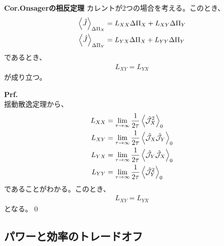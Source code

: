 \documentclass[a4paper,11pt]{jsarticle}
\numberwithin{equation}{section}
\begin{document}
\begin{itembox}[l]{\textbf{Cor.Onsagerの相反定理}}
  カレントが2つの場合を考える。このとき、
  \begin{align}
    \ev{\hat{J}}_{\Delta \Pi_X} &= L_{XX}\Delta \Pi_X + L_{XY}\Delta \Pi_Y\\
    \ev{\hat{J}}_{\Delta \Pi_Y} &= L_{YX}\Delta \Pi_X + L_{YY}\Delta \Pi_Y
  \end{align}
  であるとき、
  \begin{align}
    L_{XY} = L_{YX}
  \end{align}
  が成り立つ。
\end{itembox}
\textbf{Prf.}\\
揺動散逸定理から、
\begin{align}
  L_{XX} &= \lim_{\tau \to \infty}\frac{1}{2\tau}\ev{\hat{\mathcal{J}}_X^2}_{0}\\
  L_{XY} &= \lim_{\tau \to \infty}\frac{1}{2\tau}\ev{\hat{\mathcal{J}}_X \hat{\mathcal{J}}_Y}_{0}\\
  L_{YX} &= \lim_{\tau \to \infty}\frac{1}{2\tau}\ev{\hat{\mathcal{J}}_Y \hat{\mathcal{J}}_X}_{0}\\
  L_{YY} &= \lim_{\tau \to \infty}\frac{1}{2\tau}\ev{\hat{\mathcal{J}}_Y^2}_{0}
\end{align}
であることがわかる。このとき、
\begin{align}
  L_{XY} = L_{YX}
\end{align}
となる。\qed\\

\subsection{パワーと効率のトレードオフ}
\end{document}
